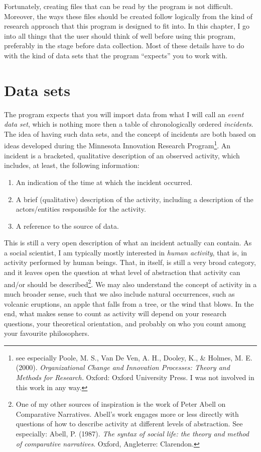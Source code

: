 \documentclass{memoir}
\begin{document}
Fortunately, creating files that can be read by the program is not difficult. Moreover, the ways these files should be created follow logically from the kind of research approach that this program is designed to fit into. In this chapter, I go into all things that the user should think of well before using this program, preferably in the stage before data collection. Most of these details have to do with the kind of data sets that the program ``expects'' you to work with.

\section{Data sets}
\label{sec:datasets}

The program expects that you will import data from what I will call an \emph{event data set}, which is nothing more then a table of chronologically ordered \emph{incidents}. The idea of having such data sets, and the concept of incidents are both based on ideas developed during the Minnesota Innovation Research Program\footnote{see especially Poole, M. S., Van De Ven, A. H., Dooley, K., \& Holmes, M. E. (2000). \emph{Organizational Change and Innovation Processes: Theory and Methods for Research.} Oxford: Oxford University Press. I was not involved in this work in any way.}. An incident is a bracketed, qualitative description of an observed activity, which includes, at least, the following information:
\begin{enumerate}
\item{An indication of the time at which the incident occurred.}
\item{A brief (qualitative) description of the activity, including a description of the actors/entities responsible for the activity.}
\item{A reference to the source of data.}
\end{enumerate}

This is still a very open description of what an incident actually can contain. As a social scientist, I am typically mostly interested in \emph{human activity}, that is, in activity performed by human beings. That, in itself, is still a very broad category, and it leaves open the question at what level of abstraction that activity can and/or should be described\footnote{One of my other sources of inspiration is the work of Peter Abell on Comparative Narratives. Abell's work engages more or less directly with questions of how to describe activity at different levels of abstraction. See especially: Abell, P. (1987). \emph{The syntax of social life: the theory and method of comparative narratives}. Oxford, Angleterre: Clarendon.}. We may also understand the concept of activity in a much broader sense, such that we also include natural occurrences, such as volcanic eruptions, an apple that falls from a tree, or the wind that blows. In the end, what makes sense to count as activity will depend on your research questions, your theoretical orientation, and probably on who you count among your favourite philosophers.
\end{document}
